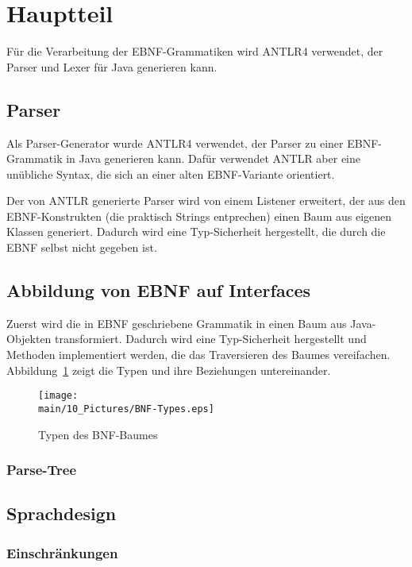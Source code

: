 \documentclass[../InterneDSLs.tex]{subfiles}
\begin{document}
\section{Hauptteil}
Für die Verarbeitung der \ac{EBNF}-Grammatiken wird ANTLR4 verwendet, der Parser und Lexer für Java generieren kann.

\subsection{Parser}
Als Parser-Generator wurde ANTLR4 verwendet, der Parser zu einer EBNF-Grammatik in Java generieren kann. Dafür verwendet ANTLR aber eine unübliche Syntax, die sich an einer alten EBNF-Variante orientiert.

Der von ANTLR generierte Parser wird von einem Listener erweitert, der aus den EBNF-Konstrukten (die praktisch Strings entprechen) einen Baum aus eigenen Klassen generiert. Dadurch wird eine Typ-Sicherheit hergestellt, die durch die EBNF selbst nicht gegeben ist.

\subsection{Abbildung von EBNF auf Interfaces}
Zuerst wird die in EBNF geschriebene Grammatik in einen Baum aus Java-Objekten transformiert. Dadurch wird eine Typ-Sicherheit hergestellt und Methoden implementiert werden, die das Traversieren des Baumes vereifachen. Abbildung~\ref{FIG:TypesBNF} zeigt die Typen und ihre Beziehungen untereinander.

\begin{figure}
\centering
\texttt{[image: \\main/10\_Pictures/BNF-Types.eps]}
\caption{Typen des BNF-Baumes}
\label{FIG:TypesBNF}
\end{figure}

\subsubsection{Parse-Tree}

\subsection{Sprachdesign}


\subsubsection{Einschränkungen}
\end{document}
